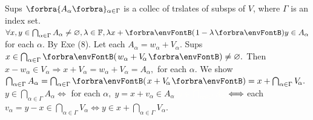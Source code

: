 Sups $\Bra{A_{\alpha}}{_{\alpha\in\Gamma}}$ is a collec of trslates of subsps of $V$, where $\Gamma$ is an index set.\vspace{2pt}\parSol{}
$\forall x,y\in\bigcap_{\alpha\in\Gamma}A_{\alpha}\neq\emptySet,\lambda\in\Fbb,\lambda x+\Par{1-\lambda}y\in A_{\alpha}$ for each $\alpha.$ By Exe (8).\PfEnd\parSol{\vspace{6pt}}
\Or Let each $A_\alpha=w_\alpha+V_{\!\alpha}.$ Sups $x\in\bigcap_{\alpha\in\Gamma}\Par{w_\alpha+V_{\!\alpha}}\neq\emptySet.$\parSol{}
Then $x-w_\alpha\in V_{\!\alpha}\Longrightarrow x+V_{\!\alpha}=w_\alpha+V_{\!\alpha}=A_\alpha,$ for each $\alpha.$\parSol{}
We show $\bigcap_{\alpha\in\Gamma}A_\alpha=\bigcap_{\alpha\in\Gamma}\Par{x+V_{\!\alpha}}=x+\bigcap_{\alpha\in\Gamma}V_{\!\alpha}.$\parSol{}
$y\in\bigcap_{\alpha\in\Gamma}A_\alpha\Longleftrightarrow$ for each $\alpha,\;y=x+v_\alpha\in A_\alpha$\parSol{}
$\Blind{y\in\bigcap_{\alpha\in\Gamma}A_\alpha}\Longleftrightarrow$ each $v_\alpha=y-x\in\bigcap_{\alpha\in\Gamma}V_{\!\alpha}\Longleftrightarrow y\in x+\bigcap_{\alpha\in\Gamma}V_{\!\alpha}.$\PfEnd
\SepLine

